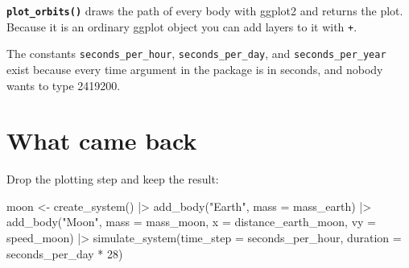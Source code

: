 \documentclass[
  10.5pt,
  letterpaper,
]{scrbook}
\newenvironment{Shaded}{\begin{snugshade}}{\end{snugshade}}
\newcommand{\AttributeTok}[1]{\textcolor[rgb]{0.00,0.00,0.00}{#1}}
\newcommand{\DecValTok}[1]{\textcolor[rgb]{0.00,0.00,0.00}{#1}}
\newcommand{\FunctionTok}[1]{\textcolor[rgb]{0.00,0.00,0.00}{#1}}
\newcommand{\NormalTok}[1]{\textcolor[rgb]{0.00,0.00,0.00}{#1}}
\newcommand{\OtherTok}[1]{\textcolor[rgb]{0.00,0.00,0.00}{#1}}
\newcommand{\SpecialCharTok}[1]{\textcolor[rgb]{0.00,0.00,0.00}{#1}}
\newcommand{\StringTok}[1]{\textcolor[rgb]{0.00,0.00,0.00}{#1}}
\theoremstyle{plain}
\theoremstyle{remark}
\begin{document}
\textbf{\texttt{plot\_orbits()}} draws the path of every body with
ggplot2 and returns the plot. Because it is an ordinary ggplot object
you can add layers to it with \texttt{+}.

The constants \texttt{seconds\_per\_hour}, \texttt{seconds\_per\_day},
and \texttt{seconds\_per\_year} exist because every time argument in the
package is in seconds, and nobody wants to type 2419200.

\section{What came back}\label{what-came-back}

Drop the plotting step and keep the result:

\begin{Shaded}
\begin{Highlighting}[]
\NormalTok{moon }\OtherTok{\textless{}{-}} \FunctionTok{create\_system}\NormalTok{() }\SpecialCharTok{|\textgreater{}}
  \FunctionTok{add\_body}\NormalTok{(}\StringTok{"Earth"}\NormalTok{, }\AttributeTok{mass =}\NormalTok{ mass\_earth) }\SpecialCharTok{|\textgreater{}}
  \FunctionTok{add\_body}\NormalTok{(}\StringTok{"Moon"}\NormalTok{, }\AttributeTok{mass =}\NormalTok{ mass\_moon, }\AttributeTok{x =}\NormalTok{ distance\_earth\_moon, }\AttributeTok{vy =}\NormalTok{ speed\_moon) }\SpecialCharTok{|\textgreater{}}
  \FunctionTok{simulate\_system}\NormalTok{(}\AttributeTok{time\_step =}\NormalTok{ seconds\_per\_hour, }\AttributeTok{duration =}\NormalTok{ seconds\_per\_day }\SpecialCharTok{*} \DecValTok{28}\NormalTok{)}


\end{Highlighting}
\end{Shaded}
\end{document}
